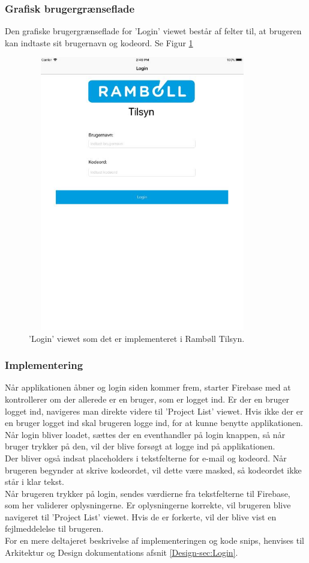 \subsubsection{Grafisk brugergrænseflade}
Den grafiske brugergrænseflade for 'Login' viewet består af felter til, at brugeren kan indtaste sit brugernavn og kodeord. Se Figur \ref{fig:LoginView}
\begin{figure}[H] %
	\centering
	\includegraphics[height=12cm, width=10cm]{Design/Applikation/Login/LoginView}
	\caption{'Login' viewet som det er implementeret i Rambøll Tilsyn.}
	\label{fig:LoginView}
\end{figure}

\subsubsection{Implementering}
Når applikationen åbner og login siden kommer frem, starter Firebase med at kontrollerer om der allerede er en bruger, som er logget ind. Er der en bruger logget ind, navigeres man direkte videre til 'Project List' viewet. Hvis ikke der er en bruger logget ind skal brugeren logge ind, for at kunne benytte applikationen. \\
Når login bliver loadet, sættes der en eventhandler på login knappen, så når bruger trykker på den, vil der blive forsøgt at logge ind på applikationen. \\
Der bliver også indsat placeholders i tekstfelterne for e-mail og kodeord. Når brugeren begynder at skrive kodeordet, vil dette være masked, så kodeordet ikke står i klar tekst. \\
Når brugeren trykker på login, sendes værdierne fra tekstfelterne til Firebase, som her validerer oplysningerne. Er oplysningerne korrekte, vil brugeren blive navigeret til 'Project List' viewet. Hvis de er forkerte, vil der blive vist en fejlmeddelelse til brugeren. \\
For en mere deltajeret beskrivelse af implementeringen og kode snips, henvises til Arkitektur og Design dokumentations afsnit \ref{Design-sec:Login}.

\clearpage